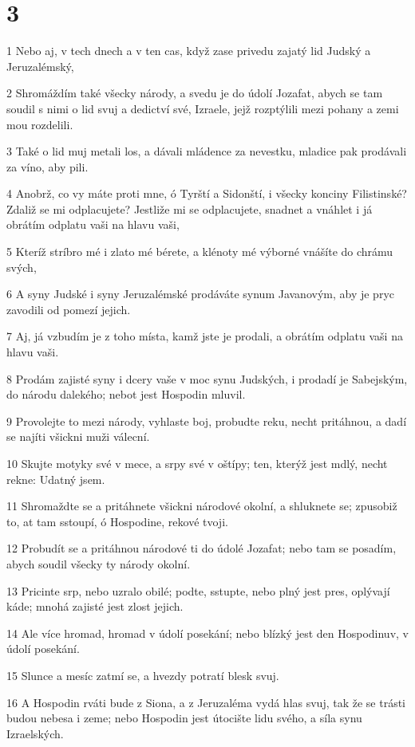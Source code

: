 \chapter{3}

\par 1 Nebo aj, v tech dnech a v ten cas, když zase privedu zajatý lid Judský a Jeruzalémský,
\par 2 Shromáždím také všecky národy, a svedu je do údolí Jozafat, abych se tam soudil s nimi o lid svuj a dedictví své, Izraele, jejž rozptýlili mezi pohany a zemi mou rozdelili.
\par 3 Také o lid muj metali los, a dávali mládence za nevestku, mladice pak prodávali za víno, aby pili.
\par 4 Anobrž, co vy máte proti mne, ó Tyrští a Sidonští, i všecky konciny Filistinské? Zdaliž se mi odplacujete? Jestliže mi se odplacujete, snadnet a vnáhlet i já obrátím odplatu vaši na hlavu vaši,
\par 5 Kteríž stríbro mé i zlato mé bérete, a klénoty mé výborné vnášíte do chrámu svých,
\par 6 A syny Judské i syny Jeruzalémské prodáváte synum Javanovým, aby je pryc zavodili od pomezí jejich.
\par 7 Aj, já vzbudím je z toho místa, kamž jste je prodali, a obrátím odplatu vaši na hlavu vaši.
\par 8 Prodám zajisté syny i dcery vaše v moc synu Judských, i prodadí je Sabejským, do národu dalekého; nebot jest Hospodin mluvil.
\par 9 Provolejte to mezi národy, vyhlaste boj, probudte reku, necht pritáhnou, a dadí se najíti všickni muži válecní.
\par 10 Skujte motyky své v mece, a srpy své v oštípy; ten, kterýž jest mdlý, necht rekne: Udatný jsem.
\par 11 Shromaždte se a pritáhnete všickni národové okolní, a shluknete se; zpusobiž to, at tam sstoupí, ó Hospodine, rekové tvoji.
\par 12 Probudít se a pritáhnou národové ti do údolé Jozafat; nebo tam se posadím, abych soudil všecky ty národy okolní.
\par 13 Pricinte srp, nebo uzralo obilé; podte, sstupte, nebo plný jest pres, oplývají káde; mnohá zajisté jest zlost jejich.
\par 14 Ale více hromad, hromad v údolí posekání; nebo blízký jest den Hospodinuv, v údolí posekání.
\par 15 Slunce a mesíc zatmí se, a hvezdy potratí blesk svuj.
\par 16 A Hospodin rváti bude z Siona, a z Jeruzaléma vydá hlas svuj, tak že se trásti budou nebesa i zeme; nebo Hospodin jest útocište lidu svého, a síla synu Izraelských.
